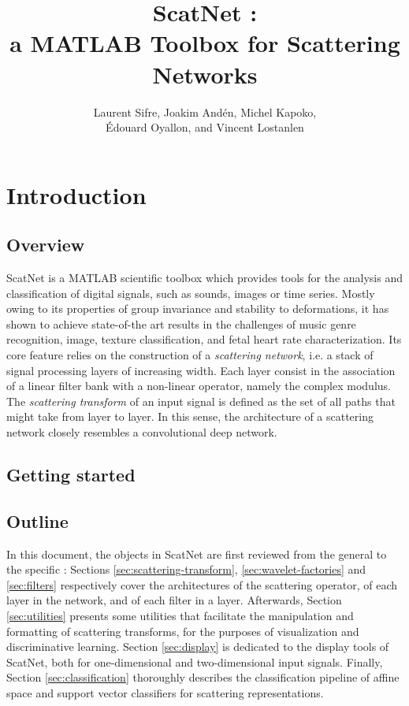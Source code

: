 \documentclass{article}
\title{ScatNet : \\ a MATLAB Toolbox for Scattering Networks}
\author{Laurent Sifre, Joakim And\'{e}n, Michel Kapoko, \\ \'{E}douard Oyallon, and Vincent Lostanlen}
\begin{document}
	
\maketitle

\section{Introduction}

\subsection{Overview}
ScatNet is a MATLAB scientific toolbox which provides tools for the analysis and classification of digital signals, such as sounds, images or time series. Mostly owing to its properties of group invariance and stability to deformations, it has shown to achieve state-of-the art results in the challenges of music genre recognition, image, texture classification, and fetal heart rate characterization.
Its core feature relies on the construction of a \emph{scattering network}, i.e. a stack of signal processing layers of increasing width. Each layer consist in the association of a linear filter bank  with a non-linear operator, namely the complex modulus.
The \emph{scattering transform} of an input signal  is defined as the set of all paths that  might take from layer to layer. In this sense, the architecture of a scattering network closely resembles a convolutional deep network.

\subsection{Getting started}

\subsection{Outline}
In this document, the objects in ScatNet are first reviewed from the general to the specific : Sections \ref{sec:scattering-transform}, \ref{sec:wavelet-factories} and \ref{sec:filters} respectively cover the architectures of the scattering operator, of each layer in the network, and of each filter in a layer.
Afterwards, Section \ref{sec:utilities} presents some utilities that facilitate the manipulation and formatting of scattering transforms, for the purposes of visualization and discriminative learning.
Section \ref{sec:display} is dedicated to the display tools of ScatNet, both for one-dimensional and two-dimensional input signals.
Finally, Section \ref{sec:classification} thoroughly describes the classification pipeline of affine space and support vector classifiers for scattering representations.
\end{document}
